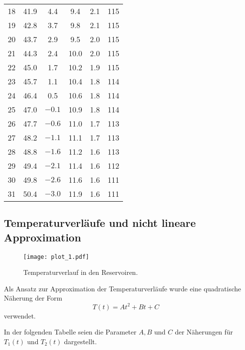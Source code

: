 \begin{table}[H]
\begin{tabular}{S[table-format=2.0] S S S S S[table-format=3.0]}
    18 & {41.9} & { 4.4} &   { 9.4} & {2.1} & {115} \\
    19 & {42.8} & { 3.7} &   { 9.8} & {2.1} & {115} \\
    20 & {43.7} & { 2.9} &   { 9.5} & {2.0} & {115} \\
    21 & {44.3} & { 2.4} &   {10.0} & {2.0} & {115} \\
    22 & {45.0} & { 1.7} &   {10.2} & {1.9} & {115} \\
    23 & {45.7} & { 1.1} &   {10.4} & {1.8} & {114} \\
    24 & {46.4} & { 0.5} &   {10.6} & {1.8} & {114} \\
    25 & {47.0} & {$-0.1$} & {10.9} & {1.8} & {114} \\
    26 & {47.7} & {$-0.6$} & {11.0} & {1.7} & {113} \\
    27 & {48.2} & {$-1.1$} & {11.1} & {1.7} & {113} \\
    28 & {48.8} & {$-1.6$} & {11.2} & {1.6} & {113} \\
    29 & {49.4} & {$-2.1$} & {11.4} & {1.6} & {112} \\
    30 & {49.8} & {$-2.6$} & {11.6} & {1.6} & {111} \\
    31 & {50.4} & {$-3.0$} & {11.9} & {1.6} & {111} \\
    \bottomrule
  \end{tabular}
\end{table}

\subsection{Temperaturverläufe und nicht lineare Approximation}

\begin{figure}[H]
  \centering
  \texttt{[image: plot\_1.pdf]}
  \caption{Temperaturverlauf in den Reservoiren.}
  \label{fig:plot1}
\end{figure}

Als Ansatz zur Approximation der Temperaturverläufe wurde eine quadratische Näherung der Form 
\begin{equation}
  T(t)=At^2+Bt+C
\end{equation}
verwendet.

\noindent In der folgenden Tabelle seien die Parameter $A, B$ und $C$ der Näherungen für $T_1(t)$ und $T_2(t)$ dargestellt.

